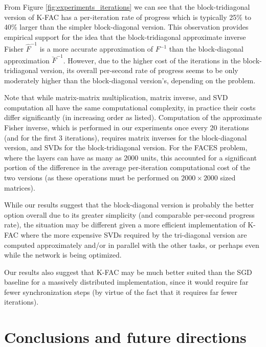 \documentclass[12pt]{article}
\newcommand{\acronym}{K-FAC}
\begin{document}
From Figure \ref{fig:experiments_iterations} we can see that the block-tridiagonal version of \acronym{} has a per-iteration rate of progress which is typically 25\% to 40\% larger than the simpler block-diagonal version.  This observation provides empirical support for the idea that the block-tridiagonal approximate inverse Fisher $\hat{F}^{-1}$ is a more accurate approximation of $F^{-1}$ than the block-diagonal approximation $\breve{F}^{-1}$.  However, due to the higher cost of the iterations in the block-tridiagonal version, its overall per-second rate of progress seems to be only moderately higher than the block-diagonal version's, depending on the problem.  


Note that while matrix-matrix multiplication, matrix inverse, and SVD computation all have the same computational complexity, in practice their costs differ significantly (in increasing order as listed).  Computation of the approximate Fisher inverse, which is performed in our experiments once every 20 iterations (and for the first 3 iterations), requires matrix inverses for the block-diagonal version, and SVDs for the block-tridiagonal version. For the FACES problem, where the layers can have as many as 2000 units, this accounted for a significant portion of the difference in the average per-iteration computational cost of the two versions (as these operations must be performed on $2000 \times 2000$ sized matrices).

While our results suggest that the block-diagonal version is probably the better option overall due to its greater simplicity (and comparable per-second progress rate), the situation may be different given a more efficient implementation of \acronym{} where the more expensive SVDs required by the tri-diagonal version are computed approximately and/or in parallel with the other tasks, or perhaps even while the network is being optimized.

Our results also suggest that \acronym{} may be much better suited than the SGD baseline for a massively distributed implementation, since it would require far fewer synchronization steps (by virtue of the fact that it requires far fewer iterations).


\section{Conclusions and future directions}
\end{document}
